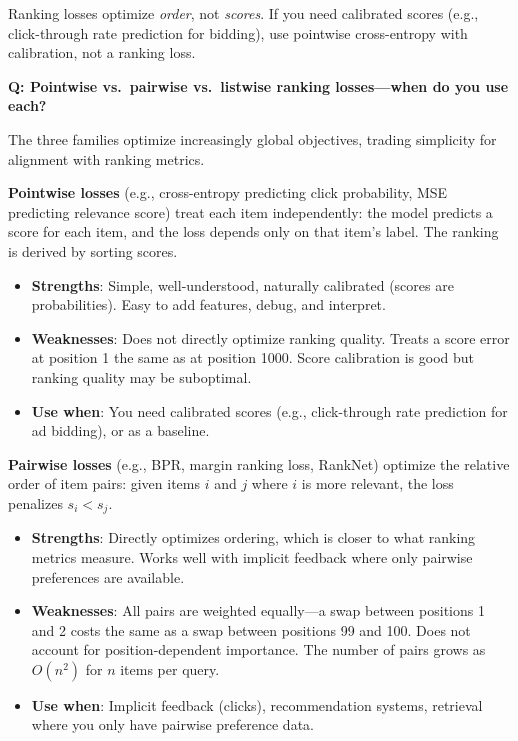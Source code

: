 \begin{warningbox}
Ranking losses optimize \textit{order}, not \textit{scores}. If you need calibrated scores (e.g., click-through rate prediction for bidding), use pointwise cross-entropy with calibration, not a ranking loss.
\end{warningbox}

\begin{interviewq}
\textbf{Q: Pointwise vs.\ pairwise vs.\ listwise ranking losses---when do you use each?}

 \quad {} \quad \badgefreq{\freqhigh}

\stronganswer The three families optimize increasingly global objectives, trading simplicity for alignment with ranking metrics.

\textbf{Pointwise losses} (e.g., cross-entropy predicting click probability, MSE predicting relevance score) treat each item independently: the model predicts a score for each item, and the loss depends only on that item's label. The ranking is derived by sorting scores.
\begin{itemize}
    \item \textbf{Strengths}: Simple, well-understood, naturally calibrated (scores are probabilities). Easy to add features, debug, and interpret.
    \item \textbf{Weaknesses}: Does not directly optimize ranking quality. Treats a score error at position 1 the same as at position 1000. Score calibration is good but ranking quality may be suboptimal.
    \item \textbf{Use when}: You need calibrated scores (e.g., click-through rate prediction for ad bidding), or as a baseline.
\end{itemize}

\textbf{Pairwise losses} (e.g., BPR, margin ranking loss, RankNet) optimize the relative order of item pairs: given items $i$ and $j$ where $i$ is more relevant, the loss penalizes $s_i < s_j$.
\begin{itemize}
    \item \textbf{Strengths}: Directly optimizes ordering, which is closer to what ranking metrics measure. Works well with implicit feedback where only pairwise preferences are available.
    \item \textbf{Weaknesses}: All pairs are weighted equally---a swap between positions 1 and 2 costs the same as a swap between positions 99 and 100. Does not account for position-dependent importance. The number of pairs grows as $O(n^2)$ for $n$ items per query.
    \item \textbf{Use when}: Implicit feedback (clicks), recommendation systems, retrieval where you only have pairwise preference data.
\end{itemize}


\end{interviewq}
